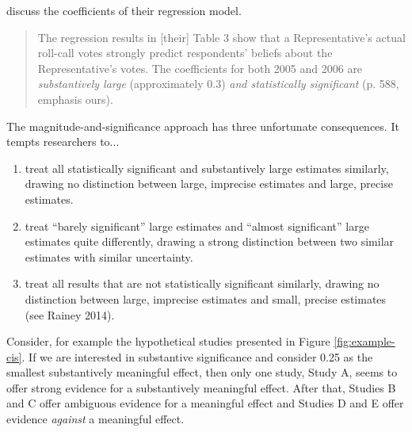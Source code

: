 \documentclass[12pt]{article}
\begin{document}
\cite{AnsolabehereJones2010} discuss the coefficients of their regression model.

\begin{quote}
The regression results in [their] Table 3 show that a Representative's actual roll-call votes strongly predict respondents' beliefs about the Representative's votes. The coefficients for both 2005 and 2006 are \emph{substantively large} (approximately 0.3) \emph{and statistically significant} (p. 588, emphasis ours). 
\end{quote}

The magnitude-and-significance approach has three unfortunate consequences. It tempts researchers to...

\begin{enumerate}
\item treat all statistically significant and substantively large estimates similarly, drawing no distinction between large, imprecise estimates and large, precise estimates.
\item treat ``barely significant'' large estimates and ``almost significant'' large estimates quite differently, drawing a strong distinction between two similar estimates with similar uncertainty.
\item treat all results that are not statistically significant similarly, drawing no distinction between large, imprecise estimates and small, precise estimates (see Rainey 2014).
\end{enumerate}

Consider, for example the hypothetical studies presented in Figure \ref{fig:example-cis}. If we are interested in substantive significance and consider 0.25 as the smallest substantively meaningful effect, then only one study, Study A, seems to offer strong evidence for a substantively meaningful effect. After that, Studies B and C offer ambiguous evidence for a meaningful effect and Studies D and E offer evidence \emph{against} a meaningful effect.
\end{document}
